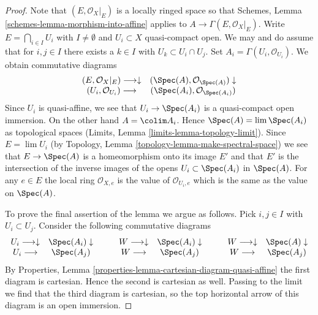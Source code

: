 \begin{proof}
Note that $(E, \mathcal{O}_X|_E)$ is a locally ringed space so that
Schemes, Lemma \ref{schemes-lemma-morphism-into-affine} applies
to $A \to \Gamma(E, \mathcal{O}_X|_E)$. Write $E = \bigcap_{i \in I} U_i$
with $I \not = \emptyset$ and $U_i \subset X$ quasi-compact open.
We may and do assume that for $i, j \in I$ there exists a $k \in I$ with
$U_k \subset U_i \cap U_j$. Set $A_i = \Gamma(U_i, \mathcal{O}_{U_i})$.
We obtain commutative diagrams
$$
\begin{array}{cc}(E, \mathcal{O}_X|_E) \longrightarrow\downarrow & (\Spec(A), \mathcal{O}_{\Spec(A)}) \downarrow \\ (U_i, \mathcal{O}_{U_i}) \longrightarrow & (\Spec(A_i), \mathcal{O}_{\Spec(A_i)})\end{array}
$$
Since $U_i$ is quasi-affine, we see that $U_i \to \Spec(A_i)$
is a quasi-compact open immersion. On the other hand
$A = \colim A_i$. Hence $\Spec(A) = \lim \Spec(A_i)$ as topological
spaces (Limits, Lemma \ref{limits-lemma-topology-limit}). Since
$E = \lim U_i$ (by Topology, Lemma \ref{topology-lemma-make-spectral-space})
we see that $E \to \Spec(A)$ is a homeomorphism onto its
image $E'$ and that $E'$ is the intersection of the inverse images
of the opens $U_i \subset \Spec(A_i)$ in $\Spec(A)$. For any
$e \in E$ the local ring $\mathcal{O}_{X, e}$ is the value
of $\mathcal{O}_{U_i, e}$ which is the same as the value on $\Spec(A)$.

\medskip\noindent
To prove the final assertion of the lemma we argue as follows.
Pick $i, j \in I$ with $U_i \subset U_j$.
Consider the following commutative diagrams
$$
\begin{array}{cc}U_i \longrightarrow\downarrow & \Spec(A_i) \downarrow \\ U_i \longrightarrow & \Spec(A_j)\end{array}
\quad\quad
\begin{array}{cc}W \longrightarrow\downarrow & \Spec(A_i) \downarrow \\ W \longrightarrow & \Spec(A_j)\end{array}
\quad\quad
\begin{array}{cc}W \longrightarrow\downarrow & \Spec(A) \downarrow \\ W \longrightarrow & \Spec(A_j)\end{array}
$$
By Properties, Lemma
\ref{properties-lemma-cartesian-diagram-quasi-affine}
the first diagram is cartesian. Hence the second is cartesian as well.
Passing to the limit we find that the third diagram
is cartesian, so the top horizontal arrow of this diagram is an open immersion.
\end{proof}

